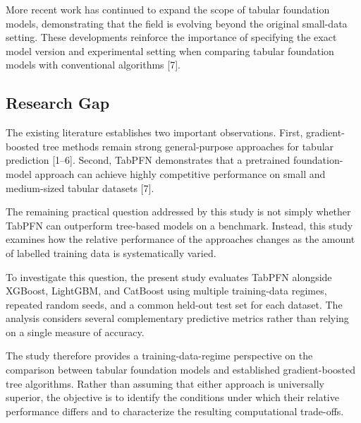 More recent work has continued to expand the scope of tabular foundation models, demonstrating that the field is evolving beyond the original small-data setting. These developments reinforce the importance of specifying the exact model version and experimental setting when comparing tabular foundation models with conventional algorithms {[}7{]}.

\subsection{Research Gap}\label{research-gap}

The existing literature establishes two important observations. First, gradient-boosted tree methods remain strong general-purpose approaches for tabular prediction {[}1--6{]}. Second, TabPFN demonstrates that a pretrained foundation-model approach can achieve highly competitive performance on small and medium-sized tabular datasets {[}7{]}.

The remaining practical question addressed by this study is not simply whether TabPFN can outperform tree-based models on a benchmark. Instead, this study examines how the relative performance of the approaches changes as the amount of labelled training data is systematically varied.

To investigate this question, the present study evaluates TabPFN alongside XGBoost, LightGBM, and CatBoost using multiple training-data regimes, repeated random seeds, and a common held-out test set for each dataset. The analysis considers several complementary predictive metrics rather than relying on a single measure of accuracy.

The study therefore provides a training-data-regime perspective on the comparison between tabular foundation models and established gradient-boosted tree algorithms. Rather than assuming that either approach is universally superior, the objective is to identify the conditions under which their relative performance differs and to characterize the resulting computational trade-offs.
